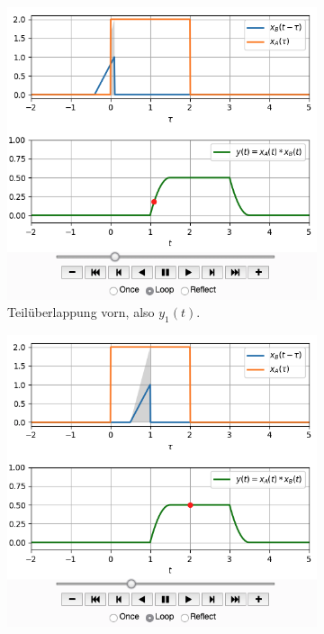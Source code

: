 \documentclass[11pt,a4paper,DIV=12]{scrartcl}
\numberwithin{equation}{section}
\numberwithin{figure}{section}
\begin{document}
\begin{figure}[h!]
\centering
\begin{subfigure}{0.45\textwidth}
\centering
\includegraphics[width=\textwidth]{../convolution_ct/conv_var1_1_1D3D68B312.png}
\caption{Teilüberlappung vorn, also $y_1(t)$.}
\label{fig:1D3D68B312_v1_1}
\end{subfigure}
\begin{subfigure}{0.45\textwidth}
\centering
\includegraphics[width=\textwidth]{../convolution_ct/conv_var1_2_1D3D68B312.png}

\end{subfigure}
\end{figure}
\end{document}
